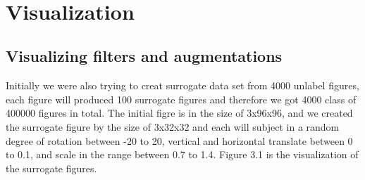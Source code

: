 \documentclass[final]{siamltexmm}
\begin{document}
\\
\section{Visualization}
\subsection{Visualizing filters and augmentations}
Initially we were also trying to creat surrogate data set from 4000 unlabel figures, each figure will produced 100 surrogate figures and therefore we got 4000 class of 400000 figures in total. The initial figre is in the size of 3x96x96, and we created the surrogate figure by the size of 3x32x32 and each will subject in a random degree of rotation between -20 to 20, vertical and horizontal translate between 0 to 0.1, and scale in the range between 0.7 to 1.4. Figure 3.1 is the visualization of the surrogate figures.
\end{document}
